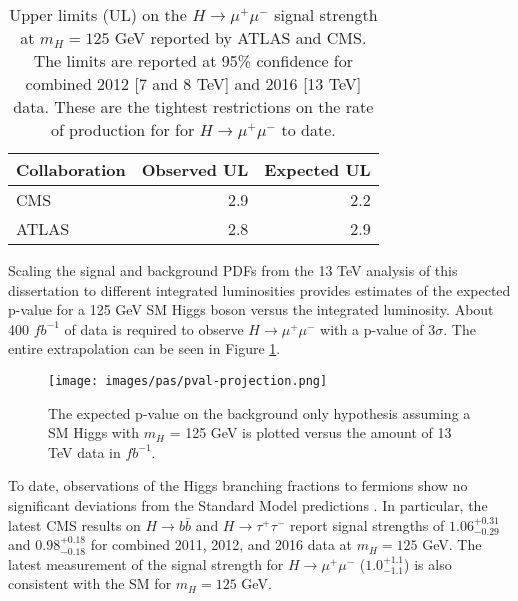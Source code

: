 \begin{table}[htb]
  \caption[Upper limits on the rate of production for $H\rightarrow\mu^+\mu^-$ at $m_H=125$ GeV.]{Upper limits (UL) on the $H\rightarrow\mu^+\mu^-$ signal strength at $m_H=125$ GeV reported by ATLAS \cite{atlashmumu2017} and CMS. The limits are reported at 95\% confidence for combined 2012 [7 and 8 TeV] and 2016 [13 TeV] data. These are the tightest restrictions on the rate of production for for $H\rightarrow\mu^+\mu^-$ to date.}
  \label{tab:cmsatlash2mu}
  \begin{center}
    \begin{tabular}{lrr}
      \hline
      Collaboration  & Observed UL & Expected UL  \\
      \hline
      CMS            &    2.9      & 2.2  \\
      ATLAS          &    2.8      & 2.9  \\
      \hline
    \end{tabular}
  \end{center}
\end{table}

Scaling the signal and background PDFs from the 13 TeV analysis of this dissertation to different integrated luminosities provides estimates of the expected p-value for a 125 GeV SM Higgs boson versus the integrated luminosity. About 400 $fb^{-1}$ of data is required to observe $H\rightarrow\mu^+\mu^-$ with a p-value of 3$\sigma$. The entire extrapolation can be seen in Figure \ref{fig:pvalprojection}.

\begin{figure}[h!]
    \centering
    \texttt{[image: images/pas/pval-projection.png]}
    \caption[The expected p-value for a 125 GeV SM Higgs boson versus the amount of 13 TeV data.]
    {The expected p-value on the background only hypothesis assuming a SM Higgs with $m_H$ = 125 GeV is plotted versus the amount of 13 TeV data in $fb^{-1}$.}
    \label{fig:pvalprojection}
\end{figure}

To date, observations of the Higgs branching fractions to fermions show no significant deviations from the Standard Model predictions \cite{cmshiggstau2017,cmshiggsbb2017, cmshmumu2017, atlashmumu2017}. In particular, the latest CMS results on $H\rightarrow b\bar{b}$ \cite{cmshiggsbb2017} and $H\rightarrow \tau^+\tau^-$ \cite{cmshiggstau2017} report signal strengths of $1.06^{+0.31}_{-0.29}$ and $0.98^{+0.18}_{-0.18}$ for combined 2011, 2012, and 2016 data at $m_H=125$ GeV. The latest measurement of the signal strength for $H\rightarrow\mu^+\mu^-$ ($1.0^{+1.1}_{-1.1}$) is also consistent with the SM for $m_H=125$ GeV. 

